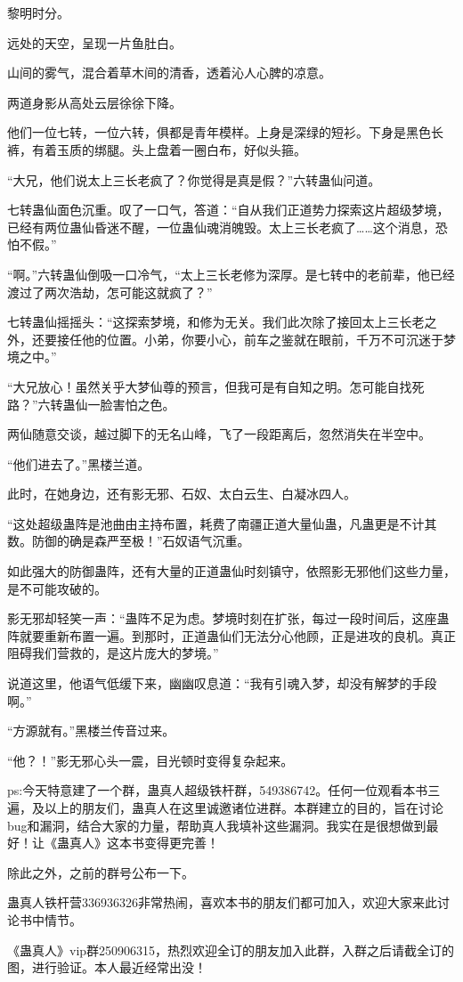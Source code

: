\begin{this_body}
黎明时分。

远处的天空，呈现一片鱼肚白。

山间的雾气，混合着草木间的清香，透着沁人心脾的凉意。

两道身影从高处云层徐徐下降。

他们一位七转，一位六转，俱都是青年模样。上身是深绿的短衫。下身是黑色长裤，有着玉质的绑腿。头上盘着一圈白布，好似头箍。

“大兄，他们说太上三长老疯了？你觉得是真是假？”六转蛊仙问道。

七转蛊仙面色沉重。叹了一口气，答道：“自从我们正道势力探索这片超级梦境，已经有两位蛊仙昏迷不醒，一位蛊仙魂消魄毁。太上三长老疯了……这个消息，恐怕不假。”

“啊。”六转蛊仙倒吸一口冷气，“太上三长老修为深厚。是七转中的老前辈，他已经渡过了两次浩劫，怎可能这就疯了？”

七转蛊仙摇摇头：“这探索梦境，和修为无关。我们此次除了接回太上三长老之外，还要接任他的位置。小弟，你要小心，前车之鉴就在眼前，千万不可沉迷于梦境之中。”

“大兄放心！虽然关乎大梦仙尊的预言，但我可是有自知之明。怎可能自找死路？”六转蛊仙一脸害怕之色。

两仙随意交谈，越过脚下的无名山峰，飞了一段距离后，忽然消失在半空中。

“他们进去了。”黑楼兰道。

此时，在她身边，还有影无邪、石奴、太白云生、白凝冰四人。

“这处超级蛊阵是池曲由主持布置，耗费了南疆正道大量仙蛊，凡蛊更是不计其数。防御的确是森严至极！”石奴语气沉重。

如此强大的防御蛊阵，还有大量的正道蛊仙时刻镇守，依照影无邪他们这些力量，是不可能攻破的。

影无邪却轻笑一声：“蛊阵不足为虑。梦境时刻在扩张，每过一段时间后，这座蛊阵就要重新布置一遍。到那时，正道蛊仙们无法分心他顾，正是进攻的良机。真正阻碍我们营救的，是这片庞大的梦境。”

说道这里，他语气低缓下来，幽幽叹息道：“我有引魂入梦，却没有解梦的手段啊。”

“方源就有。”黑楼兰传音过来。

“他？！”影无邪心头一震，目光顿时变得复杂起来。

ps:今天特意建了一个群，蛊真人超级铁杆群，549386742。任何一位观看本书三遍，及以上的朋友们，蛊真人在这里诚邀诸位进群。本群建立的目的，旨在讨论bug和漏洞，结合大家的力量，帮助真人我填补这些漏洞。我实在是很想做到最好！让《蛊真人》这本书变得更完善！

除此之外，之前的群号公布一下。

蛊真人铁杆营336936326非常热闹，喜欢本书的朋友们都可加入，欢迎大家来此讨论书中情节。

《蛊真人》vip群250906315，热烈欢迎全订的朋友加入此群，入群之后请截全订的图，进行验证。本人最近经常出没！

\end{this_body}

